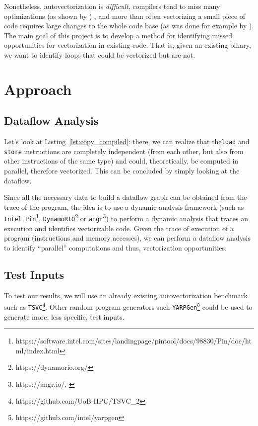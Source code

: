 \documentclass[acmsmall,review, nonacm]{acmart}
\begin{document}


\noindent Nonetheless, autovectorization is \textit{difficult}, compilers tend to miss many optimizations (as shown by \citet{Feng2021})
, and more than often
vectorizing a small piece of code requires large changes to the whole code base 
(as was done for example by \citet{Chen22}).
The main goal of this project is to develop a method for identifying missed opportunities 
for vectorization in existing code. That is, given an existing binary, we want to identify 
loops that could be vectorized but are not.

\section{Approach}
\subsection{Dataflow Analysis}
Let's look at Listing~\ref{lst:copy_compiled}: there, we can realize that 
the\texttt{load} and \texttt{store} instructions are completely independent (from each other, but also from other instructions of the same type) 
and could, theoretically, be computed in parallel, therefore vectorized. This can be concluded by simply looking at the dataflow.

Since all the necessary data to build a dataflow graph can be obtained from the trace of the program, the idea is to use a dynamic analysis framework (such as \texttt{Intel Pin}\footnote{https://software.intel.com/sites/landingpage/pintool/docs/98830/Pin/doc/html/index.html}, 
\texttt{DynamoRIO}\footnote{https://dynamorio.org/} or \texttt{angr}\footnote{https://angr.io/, \citet{shoshitaishvili2016state}}) to perform a dynamic analysis 
that traces an execution and identifies vectorizable code. 
Given the trace of execution of a program (instructions and memory accesses), we can perform a dataflow analysis to identify 
``parallel'' computations and thus, vectorization opportunities.

\subsection{Test Inputs}
To test our results, we will use an already existing autovectorization benchmark such as \texttt{TSVC}\footnote{https://github.com/UoB-HPC/TSVC\_2}.
Other random program generators such \texttt{YARPGen}\footnote{https://github.com/intel/yarpgen} could be used to generate more, less specific, test inputs.
\end{document}
